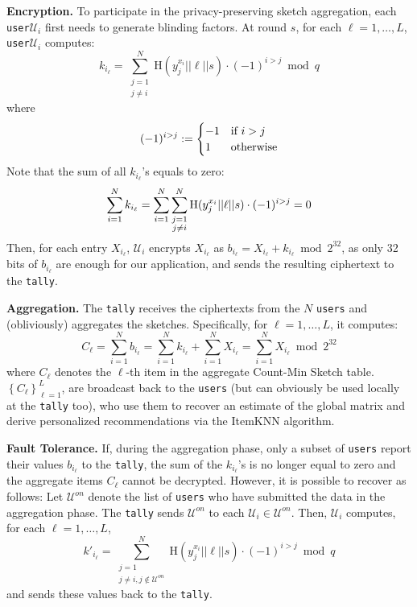 \documentclass[conference]{IEEEtran}
\newcommand{\descr}[1]{\medskip \noindent \textbf{#1}}
\newcommand{\Ui}{\mathcal{U}_i}
\newcommand{\Uon}{\mathcal{U}^{on}}
\newcommand{\user}{{\tt user}\xspace}
\newcommand{\users}{{\tt users}\xspace}
\newcommand{\tally}{{\tt tally}\xspace}
\begin{document}
\descr{Encryption.} To participate in the privacy-preserving sketch aggregation, each \user $\Ui$ first needs to generate blinding factors. At round $s$, for each $\ell=1,\dots,L$, \user $\Ui$ computes:\vspace{-0.2cm}
$$k_{i_\ell} = \sum_{\substack{j=1\\ j \neq i}}^{N} \textrm{H}(y_{j}^{x_i} || \ell || s) \cdot (-1)^{i > j} \bmod q $$ 
where
\vspace{-0.2cm}
\begin{equation*}
(-1)^{i > j} := \begin{cases}
				-1 & \text{if } i > j\\
				1 & \text{otherwise}
				\end{cases}\vspace{0.1cm}
\end{equation*}
Note that the sum of all $k_{i_\ell}$'s equals to zero:\vspace{-0.15cm}
$$\sum_{i=1}^{N}k_{i_\ell} = \sum_{i=1}^{N}\sum_{\substack{j=1\\ j \neq i}}^{N} \textrm{H}(y_{j}^{x_i} || \ell || s)  \cdot (-1)^{i > j} = 0 \vspace{-0.15cm}$$
Then, for each entry $X_{i_\ell}$, $\Ui$ encrypts $X_{i_\ell}$ as $b_{i_\ell} = X_{i_\ell} + k_{i_\ell} \bmod 2^{32}$, as only 32 bits of $b_{i_\ell}$ are enough for our application, and sends the resulting ciphertext to the \tally.

\descr{Aggregation.}
The \tally receives the ciphertexts from the $N$ \users and (obliviously) aggregates the sketches. Specifically, for $\ell=1,\dots,L$, it computes: $$C_{\ell} = \sum_{i=1}^{N}b_{i_\ell} = \sum_{i=1}^{N}k_{i_\ell} + \sum_{i=1}^{N}X_{i_\ell} = \sum_{i=1}^{N}X_{i_\ell} \bmod 2^{32}$$
where $C_{\ell}$ denotes the $\ell$-th item in the aggregate Count-Min Sketch table.
$\left\{ C_{\ell} \right\}_{\ell=1}^{L}$, are broadcast back to the \users
(but can obviously be used locally at the \tally too), who use them to recover an estimate of the global matrix and derive personalized recommendations via the ItemKNN algorithm.

\descr{Fault Tolerance.}
If, during the aggregation phase, only a subset of \users report their values $b_{i_\ell}$ to the \tally, the sum of the $k_{i_\ell}$'s is no longer equal to zero and the aggregate items $C_{\ell}$ cannot be decrypted. However, it is possible to recover as follows:
Let $\Uon$ denote the list of \users who have submitted the data in the aggregation phase. The \tally sends $\Uon$ to each $\Ui \in \Uon$.
Then, $\Ui$ computes, for each $\ell=1,\dots,L$,
$$k'_{i_\ell} = \sum_{\substack{j=1\\ j \neq i, j \not\in \Uon }}^{N} \textrm{H}(y_{j}^{x_i} || \ell || s) \cdot (-1)^{i > j} \bmod q $$ 
and sends these values back to the \tally.
\end{document}
